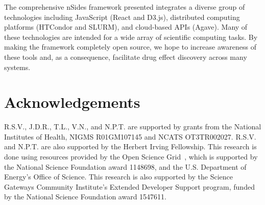 \documentclass{ws-procs11x85}
\begin{document}
The comprehensive nSides framework presented integrates a diverse
group of technologies including JavaScript (React and D3.js),
distributed computing platforms (HTCondor and SLURM), and cloud-based
APIs (Agave). Many of these technologies are intended for a wide array
of scientific computing tasks.  By making the framework completely
open source, we hope to increase awareness of these tools and, as a
consequence, facilitate drug effect discovery across many systems.

\section{Acknowledgements}
R.S.V., J.D.R., T.L., V.N., and N.P.T. are supported by grants from
the National Institutes of Health, NIGMS R01GM107145 and NCATS
OT3TR002027. R.S.V. and N.P.T. are also supported by the Herbert
Irving Fellowship. This research is done using resources provided by
the Open Science Grid~\cite{pordes2007open, sfiligoi2009pilot}, which
is supported by the National Science Foundation award 1148698, and the
U.S. Department of Energy's Office of Science.  This research is also
supported by the Science Gateways Community Institute's Extended
Developer Support program, funded by the National Science Foundation
award 1547611.







\end{document}
